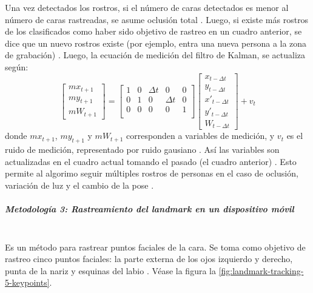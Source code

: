 \documentclass[a4paper,openright,12pt]{report}
\begin{document}
Una vez detectados los rostros, si el número de caras detectados es menor al
número de caras rastreadas, se asume oclusión total \cite{shaik2007robust}. Luego, si existe más
rostros de los clasificados como haber sido objetivo de rastreo en un cuadro
anterior, se dice que un nuevo rostros existe (por ejemplo, entra una nueva
persona a la zona de grabación) \cite{shaik2007robust}. Luego, la ecuación de medición del filtro de Kalman, se actualiza según:
\[
    \begin{bmatrix}
        mx_{t+1}\\
        my_{t+1}\\
        mW_{t+1}
    \end{bmatrix}
    =
    \begin{bmatrix}
        1   &   0   &   \Delta{t}   &   0           &   0\\
        0   &   1   &   0           &   \Delta{t}   &   0\\
        0   &   0   &   0           &   0           &   1\\
    \end{bmatrix}
    \begin{bmatrix}
        x_{t - \Delta{t}}\\
        y_{t - \Delta{t}}\\
        x'_{t - \Delta{t}}\\
        y'_{t - \Delta{t}}\\
        W_{t - \Delta{t}}
    \end{bmatrix}
    +
    v_{t}
\]
donde $mx_{t+1}$, $my_{t+1}$ y $mW_{t+1}$ corresponden a variables de medición,
y $v_{t}$ es el ruido de medición, representado por ruido gausiano \cite{shaik2007robust}. Así las
variables son actualizadas en el cuadro actual tomando el pasado (el cuadro
anterior) \cite{shaik2007robust}. Esto permite al algorimo seguir múltiples rostros de personas en el
caso de oclusión, variación de luz y el cambio de la pose \cite{shaik2007robust}.

\subparagraph{Metodología 3: Rastreamiento del landmark en un dispositivo móvil}
\mbox{} \\
Es un método para rastrear puntos faciales de la cara. Se toma como
objetivo de rastreo cinco puntos faciales: la parte externa de los ojos
izquierdo y derecho, punta de la nariz y esquinas del labio
\cite{wettum2017facial}. Véase la figura
la \ref{fig:landmark-tracking-5-keypoints}.\\
\end{document}
